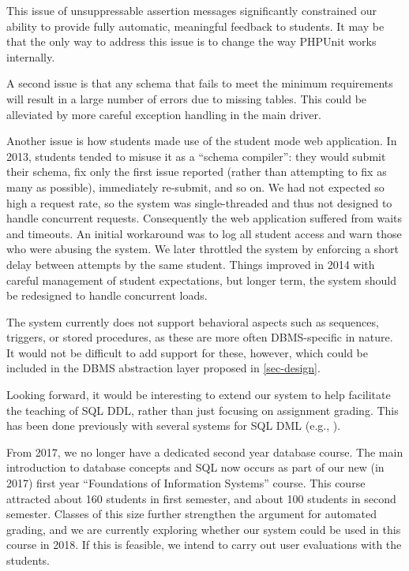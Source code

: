 \documentclass[sigconf, authordraft, capitalise]{acmart}
\begin{document}
This issue of unsuppressable assertion messages significantly constrained our ability to provide fully automatic, meaningful feedback to students. It may be that the only way to address this issue is to change the way PHPUnit works internally.

A second issue is that any schema that fails to meet the minimum requirements will result in a large number of errors due to missing tables.  This could be alleviated by more careful exception handling in the main driver.

Another issue is how students made use of the student mode web application. In 2013, students tended to misuse it as a ``schema compiler'': they would submit their schema, fix only the first issue reported (rather than attempting to fix as many as possible), immediately re-submit, and so on. We had not expected so high a request rate, so the system was single-threaded and thus not designed to handle concurrent requests. Consequently the web application suffered from waits and timeouts. An initial workaround was to log all student access and warn those who were abusing the system. We later throttled the system by enforcing a short delay between attempts by the same student. Things improved in 2014 with careful management of student expectations, but longer term, the system should be redesigned to handle concurrent loads.

The system currently does not support behavioral aspects such as sequences, triggers, or stored procedures, as these are more often DBMS-specific in nature. It would not be difficult to add support for these, however, which could be included in the DBMS abstraction layer proposed in \cref{sec-design}.

Looking forward, it would be interesting to extend our system to help facilitate the teaching of SQL DDL, rather than just focusing on assignment grading. This has been done previously with several systems for SQL DML (e.g., \cite{Kenny.C-2005a-Automated,Kleiner.C-2013a-Automated,Mitrovic.A-1998a-Learning,Russell.G-2004a-Improving,Sadiq.S-2004a-SQLator}).

From 2017, we no longer have a dedicated second year database course. The main introduction to database concepts and SQL now occurs as part of our new (in 2017) first year ``Foundations of Information Systems'' course. This course attracted about 160 students in first semester, and about 100 students in second semester. Classes of this size further strengthen the argument for automated grading, and we are currently exploring whether our system could be used in this course in 2018. If this is feasible,  we intend to carry out user evaluations with the students.
\end{document}
